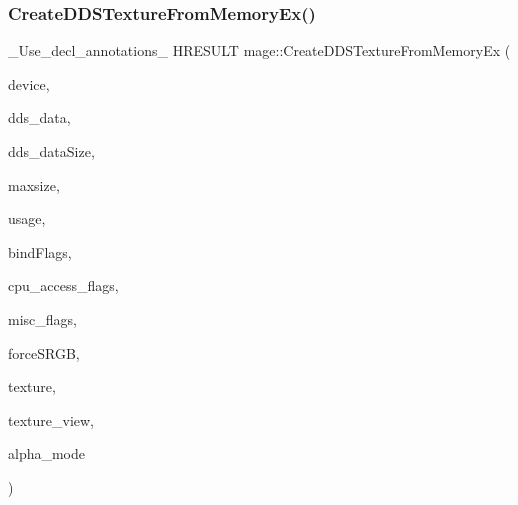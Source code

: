 \subsubsection{\texorpdfstring{Create\+D\+D\+S\+Texture\+From\+Memory\+Ex()}{CreateDDSTextureFromMemoryEx()}\hspace{0.1cm}{\footnotesize\ttfamily [3/4]}}
{\footnotesize\ttfamily \+\_\+\+Use\+\_\+decl\+\_\+annotations\+\_\+ H\+R\+E\+S\+U\+LT mage\+::\+Create\+D\+D\+S\+Texture\+From\+Memory\+Ex (\begin{DoxyParamCaption}\item[{I\+D3\+D11\+Device2 $\ast$}]{device,  }\item[{const uint8\+\_\+t $\ast$}]{dds\+\_\+data,  }\item[{size\+\_\+t}]{dds\+\_\+data\+Size,  }\item[{size\+\_\+t}]{maxsize,  }\item[{D3\+D11\+\_\+\+U\+S\+A\+GE}]{usage,  }\item[{uint32\+\_\+t}]{bind\+Flags,  }\item[{uint32\+\_\+t}]{cpu\+\_\+access\+\_\+flags,  }\item[{uint32\+\_\+t}]{misc\+\_\+flags,  }\item[{bool}]{force\+S\+R\+GB,  }\item[{I\+D3\+D11\+Resource $\ast$$\ast$}]{texture,  }\item[{I\+D3\+D11\+Shader\+Resource\+View $\ast$$\ast$}]{texture\+\_\+view,  }\item[{\hyperlink{namespacemage_a0c586a2bad862f4858900ca121ca80c2}{D\+D\+S\+\_\+\+A\+L\+P\+H\+A\+\_\+\+M\+O\+DE} $\ast$}]{alpha\+\_\+mode }\end{DoxyParamCaption})}

\hypertarget{namespacemage_ad5d3e9d297c74e18a84a3c1d9311e6a9}{}\label{namespacemage_ad5d3e9d297c74e18a84a3c1d9311e6a9} 

